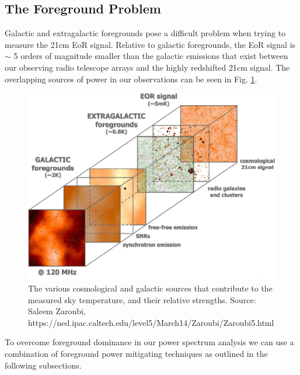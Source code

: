 \documentclass[a0,landscape]{a0poster}
\begin{document}
\begin{multicols}{4}
\color{DarkSlateGray} %
\section*{The Foreground Problem} %
Galactic and extragalactic foregrounds pose a difficult problem when trying to measure the 21cm EoR signal. Relative to galactic foregrounds, the EoR signal is $\sim$ 5 orders of magnitude smaller than the galactic emissions that exist between our observing radio telescope arrays and the highly redshifted 21cm signal. The overlapping sources of power in our observations can be seen in Fig. \ref{fig:foregroundsrcs}.


\begin{figure}[H]
\centering
\includegraphics[width=0.55\linewidth]{figures/foreground_figure.png}
\caption{The various cosmological and galactic sources that contribute to the measured sky temperature, and their relative strengths. Source: Saleem Zaroubi, https://ned.ipac.caltech.edu/level5/March14/Zaroubi/Zaroubi5.html}\label{fig:foregroundsrcs}
\end{figure}
To overcome foreground dominance in our power spectrum analysis we can use a combination of foreground power mitigating techniques as outlined in the following subsections.

\end{multicols}
\end{document}
